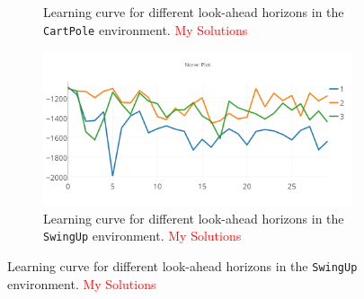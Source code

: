 \documentclass{article}
\begin{document}
\begin{figure}[h!]
\begin{subfigure}{0.45\textwidth}
        \caption{Learning curve for different look-ahead horizons in the \texttt{CartPole} environment. \textcolor{red}{My Solutions}}
    \end{subfigure}
    \hspace{0.2 in}
    \begin{subfigure}{0.45\textwidth}
        \centering
        \includegraphics[width=\textwidth]{figures/part_2_d_d.png}
        \caption{Learning curve for different look-ahead horizons in the \texttt{SwingUp} environment. \textcolor{red}{My Solutions}}
    \end{subfigure}
\end{figure}

\newpage 
\newpage
{}
\end{document}
